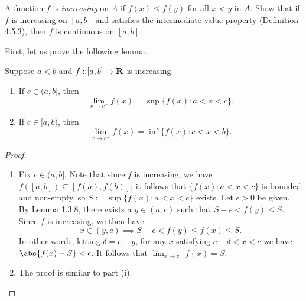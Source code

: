 \documentclass{lew98_solutions}
\begin{document}
\begin{exercise}
\label{ex:4.5.3}
    A function \( f \) is \textit{increasing} on \( A \) if \( f(x) \leq f(y) \) for all \( x < y \) in \( A \). Show that if \( f \) is increasing on \( [a, b] \) and satisfies the intermediate value property (Definition 4.5.3), then \( f \) is continuous on \( [a, b] \).
\end{exercise}

\begin{solution}
    First, let us prove the following lemma.

    \begin{lemma}
    \label{lem:ex4.5.3} 
        Suppose \( a < b \) and \( f : [a, b] \to \mathbf{R} \) is increasing.
        \begin{enumerate}[label = (\roman*)]
            \item If \( c \in (a, b] \), then
            \[
                \lim_{x \to c^-} f(x) = \sup \{ f(x) : a < x < c \}.
            \]

            \item If \( c \in [a, b) \), then
            \[
                \lim_{x \to c^+} f(x) = \inf \{ f(x) : c < x < b \}.
            \]
        \end{enumerate}
    \end{lemma}

    \begin{proof}
        \begin{enumerate}[label = (\roman*)]
            \item Fix \( c \in (a, b] \). Note that since \( f \) is increasing, we have \( f([a, b]) \subseteq [f(a), f(b)] \); it follows that \( \{ f(x) : a < x < c \} \) is bounded and non-empty, so \( S := \sup \{ f(x) : a < x < c \} \) exists. Let \( \epsilon > 0 \) be given.  By Lemma 1.3.8, there exists a \( y \in (a, c) \) such that \( S - \epsilon < f(y) \leq S \). Since \( f \) is increasing, we then have
            \[
                x \in (y, c) \implies S - \epsilon < f(y) \leq f(x) \leq S.
            \]
            In other words, letting \( \delta = c - y \), for any \( x \) satisfying \( c - \delta < x < c \) we have \( \abs{f(x) - S} < \epsilon \). It follows that \( \lim_{x \to c^-} f(x) = S \).

            \item The proof is similar to part (i). \qedhere
        \end{enumerate}
    \end{proof}


\end{solution}
\end{document}
